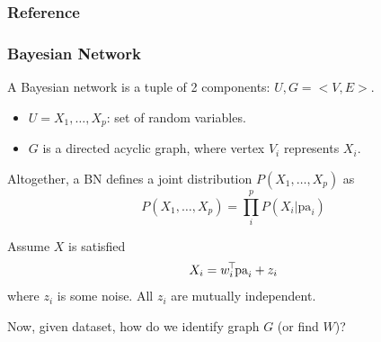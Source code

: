 \documentclass[10pt,xcolor={usenames,dvipsnames,table}]{beamer}
\begin{document}
\appendix
\begin{frame}[allowframebreaks]
    \frametitle{Reference}
    \printbibliography
\end{frame}

\begin{frame}
    \frametitle{Bayesian Network}
    A Bayesian network is a tuple of 2 components: $U, G=<V, E>$.
     \begin{itemize}
        \item $U={X_1, \ldots , X_p}$: set of random variables.
        \item $G$ is a directed acyclic graph, where vertex $V_i$ represents $X_i$. 
    \end{itemize}
    Altogether, a BN defines a joint distribution $P(X_1, \ldots , X_p)$ as
    \[
    P(X_1, \ldots , X_p) = \prod_{i}^{p} P(X_i| \text{pa}_i)
    \] 

    Assume $X$ is satisfied
    \[
    X_i = w_i^{\!\top\!} \text{pa}_i + z_i
    \] 
    where $z_i$ is some noise. All $z_i$ are mutually independent.

    Now, given dataset, how do we identify graph $G$ (or find $W$)?
\end{frame}
%
\end{document}
